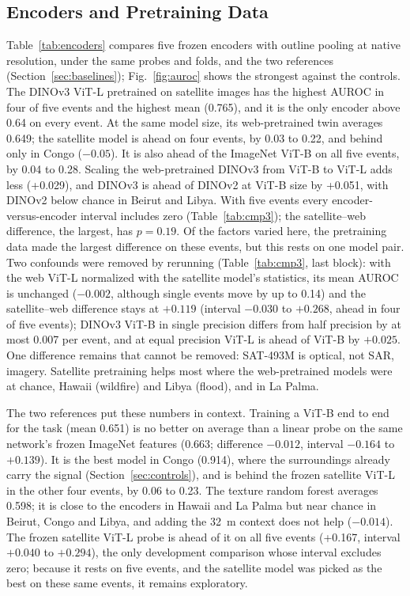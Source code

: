\documentclass{ieeeaccess}
\begin{document}
\subsection{Encoders and Pretraining Data}
\label{sec:res-encoders}
Table~\ref{tab:encoders} compares five frozen encoders with outline pooling at native resolution, under the same probes and folds, and the two references (Section~\ref{sec:baselines}); Fig.~\ref{fig:auroc} shows the strongest against the controls. The DINOv3 ViT-L pretrained on satellite images has the highest AUROC in four of five events and the highest mean (0.765), and it is the only encoder above 0.64 on every event. At the same model size, its web-pretrained twin averages 0.649; the satellite model is ahead on four events, by 0.03 to 0.22, and behind only in Congo ($-0.05$). It is also ahead of the ImageNet ViT-B on all five events, by 0.04 to 0.28. Scaling the web-pretrained DINOv3 from ViT-B to ViT-L adds less (+0.029), and DINOv3 is ahead of DINOv2 at ViT-B size by +0.051, with DINOv2 below chance in Beirut and Libya. With five events every encoder-versus-encoder interval includes zero (Table~\ref{tab:cmp3}); the satellite--web difference, the largest, has $p=0.19$. Of the factors varied here, the pretraining data made the largest difference on these events, but this rests on one model pair. Two confounds were removed by rerunning (Table~\ref{tab:cmp3}, last block): with the web ViT-L normalized with the satellite model's statistics, its mean AUROC is unchanged ($-0.002$, although single events move by up to 0.14) and the satellite--web difference stays at $+0.119$ (interval $-0.030$ to $+0.268$, ahead in four of five events); DINOv3 ViT-B in single precision differs from half precision by at most 0.007 per event, and at equal precision ViT-L is ahead of ViT-B by $+0.025$. One difference remains that cannot be removed: SAT-493M is optical, not SAR, imagery. Satellite pretraining helps most where the web-pretrained models were at chance, Hawaii (wildfire) and Libya (flood), and in La Palma.

The two references put these numbers in context. Training a ViT-B end to end for the task (mean 0.651) is no better on average than a linear probe on the same network's frozen ImageNet features (0.663; difference $-0.012$, interval $-0.164$ to $+0.139$). It is the best model in Congo (0.914), where the surroundings already carry the signal (Section~\ref{sec:controls}), and is behind the frozen satellite ViT-L in the other four events, by 0.06 to 0.23. The texture random forest averages 0.598; it is close to the encoders in Hawaii and La Palma but near chance in Beirut, Congo and Libya, and adding the 32~m context does not help ($-0.014$). The frozen satellite ViT-L probe is ahead of it on all five events (+0.167, interval $+0.040$ to $+0.294$), the only development comparison whose interval excludes zero; because it rests on five events, and the satellite model was picked as the best on these same events, it remains exploratory.
\end{document}
